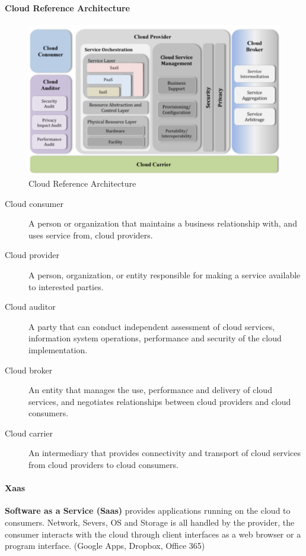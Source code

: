 \paragraph{Cloud Reference Architecture}
\begin{figure}[H]
  \centering
  \includegraphics[width=.8\textwidth]{images/cloud_reference_architecture.png}
  \caption{Cloud Reference Architecture}
\end{figure}
\begin{description}
  \item[Cloud consumer] A person or organization that maintains a business relationship with, and uses service from, cloud providers.
  \item[Cloud provider] A person, organization, or entity responsible for making a service available to interested parties.
  \item[Cloud auditor] A party that can conduct independent assessment of cloud services, information system operations, performance and security of the cloud implementation.
  \item[Cloud broker] An entity that manages the use, performance and delivery of cloud services, and negotiates relationships between cloud providers and cloud consumers.
  \item[Cloud carrier] An intermediary that provides connectivity and transport of cloud services from cloud providers to cloud consumers.
\end{description}

\paragraph{Xaas}
\textbf{Software as a Service (Saas)} provides applications running on the cloud to consumers.
Network, Severs, OS and Storage is all handled by the provider, the consumer interacts with the cloud through client interfaces as a web browser or a program interface. (Google Apps, Dropbox, Office 365)\\

